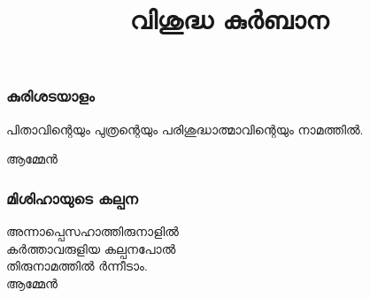 \documentclass[20pt]{beamer}
\title{വിശുദ്ധ കുര്‍ബാന}
\newcommand{\Priest}[1]{\color{white}#1}
\newcommand{\People}[1]{\color{yellow}#1}
\newcommand{\Ammen}{\People{ആമ്മേന്‍}}
\begin{document}
\begin{frame}[allowframebreaks]
\frametitle{കുരിശടയാളം}
\Priest{
പിതാവിന്റെയും പുത്രന്റെയും പരിശുദ്ധാത്മാവിന്റെയും നാമത്തില്‍.
}
\Ammen
\end{frame}

\begin{frame}[allowframebreaks]
\frametitle{മിശിഹായുടെ കല്പന}
\Priest{
അന്നാപ്പെസഹാത്തിരുനാളില്‍\\
കര്‍ത്താവരുളിയ കല്പനപോല്‍\\
തിരുനാമത്തില്‍ ര്‍ന്നീടാം.\\
}
\Ammen
\end{frame}
\end{document}

